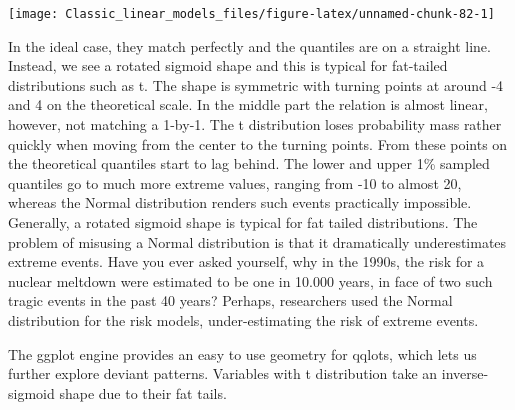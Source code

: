 \documentclass[]{svmono}
\newenvironment{Shaded}{\begin{snugshade}}{\end{snugshade}}
\newcommand{\KeywordTok}[1]{\textcolor[rgb]{0.13,0.29,0.53}{\textbf{#1}}}
\newcommand{\DataTypeTok}[1]{\textcolor[rgb]{0.13,0.29,0.53}{#1}}
\newcommand{\DecValTok}[1]{\textcolor[rgb]{0.00,0.00,0.81}{#1}}
\newcommand{\StringTok}[1]{\textcolor[rgb]{0.31,0.60,0.02}{#1}}
\newcommand{\OperatorTok}[1]{\textcolor[rgb]{0.81,0.36,0.00}{\textbf{#1}}}
\newcommand{\NormalTok}[1]{#1}
\begin{document}
\begin{Shaded}
\end{Shaded}

\texttt{[image: Classic\_linear\_models\_files/figure-latex/unnamed-chunk-82-1]}

In the ideal case, they match perfectly and the quantiles are on a
straight line. Instead, we see a rotated sigmoid shape and this is
typical for fat-tailed distributions such as t. The shape is symmetric
with turning points at around -4 and 4 on the theoretical scale. In the
middle part the relation is almost linear, however, not matching a
1-by-1. The t distribution loses probability mass rather quickly when
moving from the center to the turning points. From these points on the
theoretical quantiles start to lag behind. The lower and upper 1\%
sampled quantiles go to much more extreme values, ranging from -10 to
almost 20, whereas the Normal distribution renders such events
practically impossible. Generally, a rotated sigmoid shape is typical
for fat tailed distributions. The problem of misusing a Normal
distribution is that it dramatically underestimates extreme events. Have
you ever asked yourself, why in the 1990s, the risk for a nuclear
meltdown were estimated to be one in 10.000 years, in face of two such
tragic events in the past 40 years? Perhaps, researchers used the Normal
distribution for the risk models, under-estimating the risk of extreme
events.

The ggplot engine provides an easy to use geometry for qqlots, which
lets us further explore deviant patterns. Variables with t distribution
take an inverse-sigmoid shape due to their fat tails.
\end{document}
